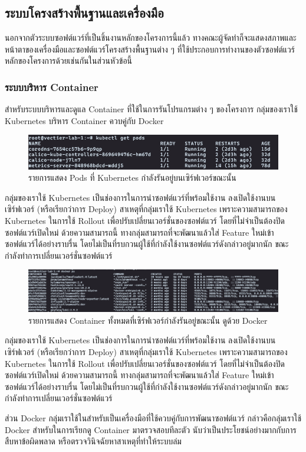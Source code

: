 \documentclass[12pt,one side,openright,a4paper]{cpe-thesis-th}
\newcommand{\thaijustify}[1]{%
  \par\hspace{30pt}\justifying
  #1
}
\begin{document}
\subsection{ระบบโครงสร้างพื้นฐานและเครื่องมือ}
นอกจากตัวระบบซอฟต์แวร์ที่เป็นชิ้นงานหลักของโครงการนี้แล้ว ทางคณะผู้จัดทำก็จะแสดงสภาพและหน้าตาของเครื่องมือและซอฟต์แวร์โครงสร้างพื้นฐานต่าง ๆ ที่ใช้ประกอบการทำงานของตัวซอฟต์แวร์หลักของโครงการด้วยเช่นกันในส่วนหัวข้อนี้
\subsubsection{ระบบบริหาร Container}
\thaijustify{
  สำหรับระบบบริหารและดูแล Container ที่ใช้ในการรันโปรแกรมต่าง ๆ ของโครงการ กลุ่มของเราใช้ Kubernetes บริหาร Container ควบคู่กับ Docker
}
\begin{figure}[H]
  \centering
  \includegraphics[width=15cm]{figure/results/kubectl.png}
  \caption[รายการ Pods ของ Kubernetes]{รายการแสดง Pods ที่ Kubernetes กำลังรันอยู่บนเซิร์ฟเวอร์ขณะนั้น}
  \label{fig:res-kube}
\end{figure}
\thaijustify{
  กลุ่มของเราใช้ Kubernetes เป็นช่องการในการนำซอฟต์แวร์ที่พร้อมใช้งาน ลงเปิดใช้งานบนเซิร์ฟเวอร์ (หรือเรียกว่าการ Deploy) สาเหตุที่กลุ่มเราใช้ Kubernetes เพราะความสามารถของ Kubernetes ในการใช้ Rollout เพื่อปรับเปลี่ยนเวอร์ชั่นของซอฟต์แวร์ โดยที่ไม่จำเป็นต้องปิดซอฟต์แวร์เปิดใหม่ ด้วยความสามารถนี้ ทางกลุ่มสามารถที่จะพัฒนาแล้วใส่ Feature ใหม่เข้าซอฟต์แวร์ได้อย่างราบรื่น โดยไม่เป็นที่รบกวนผู้ใช้ที่กำลังใช้งานซอฟต์แวร์ดังกล่าวอยู่มากนัก ขณะกำลังทำการเปลี่ยนเวอร์ชั่นซอฟต์แวร์
}
\begin{figure}[H]
  \centering
  \includegraphics[width=15cm]{figure/results/dockerps.png}
  \caption[รายการ Container แสดงด้วย Docker]{รายการแสดง Container ทั้งหมดที่เซิร์ฟเวอร์กำลังรันอยู่ขณะนั้น ดูด้วย Docker}
  \label{fig:res-docker}
\end{figure}
\thaijustify{
  กลุ่มของเราใช้ Kubernetes เป็นช่องการในการนำซอฟต์แวร์ที่พร้อมใช้งาน ลงเปิดใช้งานบนเซิร์ฟเวอร์ (หรือเรียกว่าการ Deploy) สาเหตุที่กลุ่มเราใช้ Kubernetes เพราะความสามารถของ Kubernetes ในการใช้ Rollout เพื่อปรับเปลี่ยนเวอร์ชั่นของซอฟต์แวร์ โดยที่ไม่จำเป็นต้องปิดซอฟต์แวร์เปิดใหม่ ด้วยความสามารถนี้ ทางกลุ่มสามารถที่จะพัฒนาแล้วใส่ Feature ใหม่เข้าซอฟต์แวร์ได้อย่างราบรื่น โดยไม่เป็นที่รบกวนผู้ใช้ที่กำลังใช้งานซอฟต์แวร์ดังกล่าวอยู่มากนัก ขณะกำลังทำการเปลี่ยนเวอร์ชั่นซอฟต์แวร์
}
\thaijustify{
  ส่วน Docker กลุ่มเราใช้ในสำหรับเป็นเครื่องมือที่ใช้ควบคู่กับการพัฒนาซอฟต์แวร์ กล่าวคือกลุ่มเราใช้ Docker สำหรับในการเรียกดู Container มาตรวจสอบทีละตัว นับว่าเป็นประโยชน์อย่างมากกับการสืบหาข้อผิดพลาด หรือตรวจวินิจฉัยหาสาเหตุที่ทำให้ระบบล่ม
}
\end{document}
